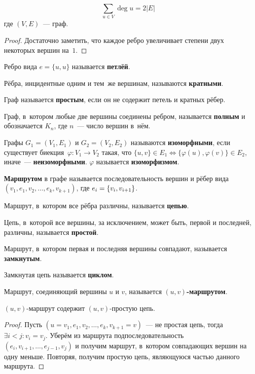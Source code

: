 \begin{lemma}[о~рукопожатиях]
\begin{equation*}
\sum_{u \in V} \deg u = 2|E|
\end{equation*}
где $(V, E)$~--- граф.
\end{lemma}
\begin{proof}
Достаточно заметить, что каждое ребро увеличивает степени двух некоторых вершин на~$1$.
\end{proof}

 Ребро вида $e = \{ u, u \}$ называется \textbf{петлёй}.

Рёбра, инцидентные одним и тем~же вершинам, называются \textbf{кратными}.

Граф называется \textbf{простым}, если он не содержит петель и кратных рёбер.

Граф, в~котором любые две вершины соединены ребром, называется \textbf{полным} и обозначается $K_n$, где $n$~--- число вершин в~нём.

Графы $G_1 = (V_1, E_1)$ и $G_2 = (V_2, E_2)$ называются \textbf{изоморфными}, если существует биекция~$\varphi \colon V_1 \to V_2$ такая, что
$\{ u, v \} \in E_1 \Leftrightarrow \{ \varphi(u), \varphi(v) \} \in E_2$, иначе~--- \textbf{неизоморфными}.
$\varphi$ называется \textbf{изоморфизмом}.

 \textbf{Маршрутом} в графе называется последовательность вершин и рёбер вида
$(v_1, e_1, v_2, \ldots, e_k, v_{k+1})$, где $e_i \opbr= \{ v_i, v_{i+1} \}$.

 Маршрут, в~котором все рёбра различны, называется \textbf{цепью}.

Цепь, в~которой все вершины, за исключением, может быть, первой и последней, различны, называется \textbf{простой}.

Маршрут, в~котором первая и последняя вершины совпадают, называется \textbf{замкнутым}.

 Замкнутая цепь называется \textbf{циклом}.

Маршрут, соединяющий вершины $u$ и $v$, называется \textbf{$(u, v)$-маршрутом}.

\begin{lemma}
\label{lemma:walk_contains_simple_chain}
$(u, v)$-маршрут содержит $(u, v)$-простую цепь.
\end{lemma}
\begin{proof}
Пусть $(u = v_1, e_1, v_2, \ldots, e_k, v_{k+1} = v)$~--- не простая цепь, тогда $\exists i < j \colon v_i = v_j$.
Уберём из маршрута подпоследовательность $(e_i, v_{i+1}, \ldots, e_{j-1}, v_j)$ и получим маршрут, в~котором совпадающих вершин на одну меньше.
Повторяя, получим простую цепь, являющуюся частью данного маршрута.
\end{proof}

